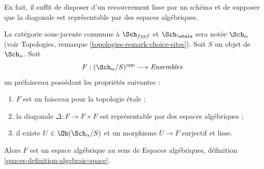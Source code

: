 \noindent
En fait, il suffit de disposer d'un recouvrement lisse par un schéma et de supposer
que la diagonale est représentable par des espaces algébriques.

\begin{lemma}
\label{lemma-spaces-etale-smooth-cover}
La catégorie sous-jacente commune à $\Sch_{fppf}$
et $\Sch_\etale$ sera notée $\Sch_\alpha$ (voir
Topologies, remarque \ref{topologies-remark-choice-sites}). Soit $S$ un objet
de $\Sch_\alpha$. Soit
$$
F : (\Sch_\alpha/S)^{opp} \longrightarrow \textit{Ensembles}
$$
un préfaisceau possédant les propriétés suivantes :
\begin{enumerate}
\item $F$ est un faisceau pour la topologie étale ;
\item la diagonale $\Delta : F \to F \times F$ est représentable
par des espaces algébriques ;
\item il existe $U \in \Ob(\Sch_\alpha/S)$
et un morphisme $U \to F$ surjectif et lisse.
\end{enumerate}
Alors $F$ est un espace algébrique au sens de
Espaces algébriques, définition \ref{spaces-definition-algebraic-space}.
\end{lemma}

